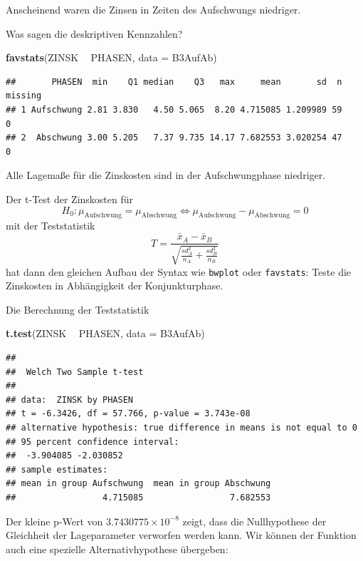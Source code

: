 \documentclass[12pt,ngerman,paper=a4,pagesize,DIV=13]{scrreprt}
\newenvironment{Shaded}{\begin{snugshade}}{\end{snugshade}}
\newcommand{\DataTypeTok}[1]{\textcolor[rgb]{0.13,0.29,0.53}{#1}}
\newcommand{\KeywordTok}[1]{\textcolor[rgb]{0.13,0.29,0.53}{\textbf{#1}}}
\newcommand{\NormalTok}[1]{#1}
\newcommand{\OperatorTok}[1]{\textcolor[rgb]{0.81,0.36,0.00}{\textbf{#1}}}
\newcommand{\StringTok}[1]{\textcolor[rgb]{0.31,0.60,0.02}{#1}}
\begin{document}
Anscheinend waren die Zinsen in Zeiten des Aufschwungs niedriger.

Was sagen die deskriptiven Kennzahlen?

\begin{Shaded}
\begin{Highlighting}[]
\KeywordTok{favstats}\NormalTok{(ZINSK }\OperatorTok{~}\StringTok{ }\NormalTok{PHASEN, }\DataTypeTok{data =}\NormalTok{ B3AufAb)}
\end{Highlighting}
\end{Shaded}

\begin{verbatim}
##       PHASEN  min    Q1 median    Q3   max     mean       sd  n missing
## 1 Aufschwung 2.81 3.830   4.50 5.065  8.20 4.715085 1.209989 59       0
## 2  Abschwung 3.00 5.205   7.37 9.735 14.17 7.682553 3.020254 47       0
\end{verbatim}

Alle Lagemaße für die Zinskosten sind in der Aufschwungphase niedriger.

Der t-Test der Zinskosten für
\[H_0: \mu_{\text{Aufschwung}}=\mu_{\text{Abschwung}} \Leftrightarrow \mu_{\text{Aufschwung}}-\mu_{\text{Abschwung}}=0\]
mit der Teststatistik
\[T=\frac{\bar{x}_A-\bar{x}_B}{\sqrt{\frac{sd^2_A}{{n_A}}+\frac{sd^2_B}{{n_B}}}}\]
hat dann den gleichen Aufbau der Syntax wie \texttt{bwplot} oder
\texttt{favstats}: Teste die Zinskosten in Abhängigkeit der
Konjunkturphase.

Die Berechnung der Teststatistik

\begin{Shaded}
\begin{Highlighting}[]
\KeywordTok{t.test}\NormalTok{(ZINSK }\OperatorTok{~}\StringTok{ }\NormalTok{PHASEN, }\DataTypeTok{data =}\NormalTok{ B3AufAb)}
\end{Highlighting}
\end{Shaded}

\begin{verbatim}
## 
##  Welch Two Sample t-test
## 
## data:  ZINSK by PHASEN
## t = -6.3426, df = 57.766, p-value = 3.743e-08
## alternative hypothesis: true difference in means is not equal to 0
## 95 percent confidence interval:
##  -3.904085 -2.030852
## sample estimates:
## mean in group Aufschwung  mean in group Abschwung 
##                 4.715085                 7.682553
\end{verbatim}

Der kleine p-Wert von \(3.7430775\times 10^{-8}\) zeigt, dass die
Nullhypothese der Gleichheit der Lageparameter verworfen werden kann.
Wir können der Funktion auch eine spezielle Alternativhypothese
übergeben:
\end{document}
